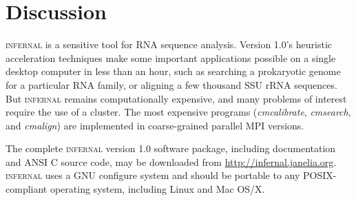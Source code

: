 \section{Discussion}

\textsc{infernal} is a sensitive tool for RNA sequence analysis.
Version 1.0's heuristic acceleration techniques make some important
applications possible on a single desktop computer in less than
an hour, such as searching a prokaryotic genome for a particular RNA
family, or aligning a few thousand SSU rRNA sequences.  But
\textsc{infernal} remains computationally expensive, and many problems
of interest require the use of a cluster.  The most expensive programs
(\emph{cmcalibrate}, \emph{cmsearch}, and \emph{cmalign}) are
implemented in coarse-grained parallel MPI versions.







The complete \textsc{infernal} version 1.0 software package, including
documentation and ANSI C source code, may be downloaded from
\url{http://infernal.janelia.org}. \textsc{infernal} uses a GNU
configure system and should be portable to any POSIX-compliant
operating system, including Linux and Mac OS/X.
